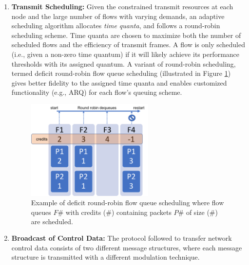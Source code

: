 \documentclass[11pt]{article}
\begin{document}
\begin{enumerate}
     \item \textbf{Transmit Scheduling:} 
     Given the constrained transmit resources at each node and the large number of flows with varying demands, an adaptive scheduling algorithm allocates \textit{time quanta}, and follows a round-robin scheduling scheme.  Time quanta are chosen to maximize both the number of scheduled flows and the efficiency of transmit frames. A flow is only scheduled (i.e., given a non-zero time quantum) if it will likely achieve its performance thresholds with its assigned quantum.   A variant of round-robin scheduling, termed deficit round-robin flow queue scheduling (illustrated in Figure \ref{fg:DeficitRR}) gives better fidelity to the assigned time quanta and enables customized functionality (e.g., ARQ) for each flow's queuing scheme.
     \begin{figure} [htb]
     \centerline{
     \includegraphics[width = 0.6\textwidth]{Figures/DeficitRR.png}}
     \caption{Example of deficit round-robin flow queue scheduling where flow queues $F\#$ with credits ($\#$) containing packets $P\#$ of size ($\#$) are scheduled.}
     \label{fg:DeficitRR}
     \end{figure}
     
     \item \textbf{Broadcast of Control Data:}
     The protocol followed to transfer network control data consists of two different message structures, where each message structure is transmitted with a different modulation technique. 


\end{enumerate}
\end{document}
